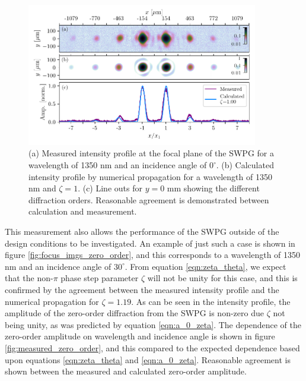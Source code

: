 \begin{figure}
	\centering
	\includegraphics[width=0.9\textwidth]{figures/Two_source/focus_imgs.pdf}
	\caption[Measured and calculated intensity profile at the focal plane when using the SWPG]{(a) Measured intensity profile at the focal plane of the SWPG for a wavelength of 1350 nm and an incidence angle of $0^{\circ}$.  (b) Calculated intensity profile by numerical propagation for a wavelength of 1350 nm and $\zeta=1$.  (c) Line outs for $y=0$ mm showing the different diffraction orders.  Reasonable agreement is demonstrated between calculation and measurement.}
	\label{fig:focus_imgs_no_zero_order}
\end{figure}

This measurement also allows the performance of the SWPG outside of the design conditions to be investigated.  An example of just such a case is shown in figure \ref{fig:focus_imgs_zero_order}, and this corresponds to a wavelength of 1350 nm and an incidence angle of $30^{\circ}$.  From equation \ref{eqn:zeta_theta}, we expect that the non-$\pi$ phase step parameter $\zeta$ will not be unity for this case, and this is confirmed by the agreement between the measured intensity profile and the numerical propagation for $\zeta=1.19$.  As can be seen in the intensity profile, the amplitude of the zero-order diffraction from the SWPG is non-zero due $\zeta$ not being unity, as was predicted by equation \ref{eqn:a_0_zeta}. The dependence of the zero-order amplitude on wavelength and incidence angle is shown in figure \ref{fig:measured_zero_order}, and this compared to the expected dependence based upon equations \ref{eqn:zeta_theta} and \ref{eqn:a_0_zeta}.  Reasonable agreement is shown between the measured and calculated zero-order amplitude. 


